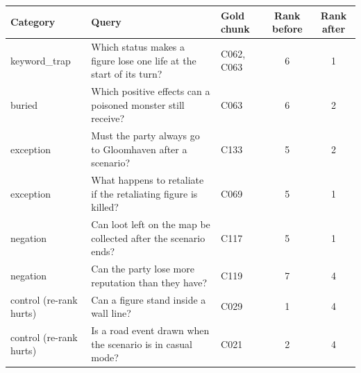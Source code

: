 \begin{tabular}{lp{6cm}lcc}
\toprule
Category & Query & Gold chunk & Rank before & Rank after \\
\midrule
keyword\_trap & Which status makes a figure lose one life at the start of its turn? & C062, C063 & 6 & 1 \\
buried & Which positive effects can a poisoned monster still receive? & C063 & 6 & 2 \\
exception & Must the party always go to Gloomhaven after a scenario? & C133 & 5 & 2 \\
exception & What happens to retaliate if the retaliating figure is killed? & C069 & 5 & 1 \\
negation & Can loot left on the map be collected after the scenario ends? & C117 & 5 & 1 \\
negation & Can the party lose more reputation than they have? & C119 & 7 & 4 \\
control (re-rank hurts) & Can a figure stand inside a wall line? & C029 & 1 & 4 \\
control (re-rank hurts) & Is a road event drawn when the scenario is in casual mode? & C021 & 2 & 4 \\
\bottomrule
\end{tabular}
